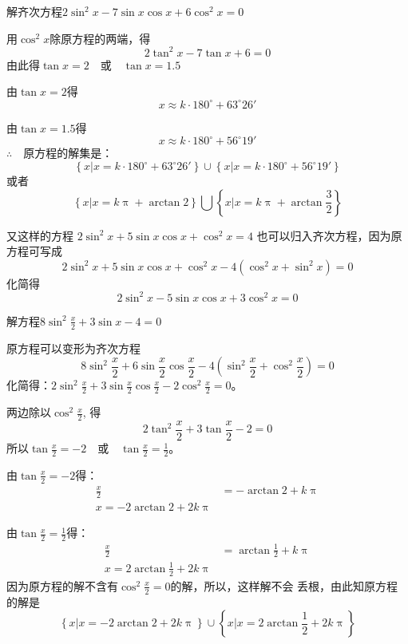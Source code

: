 \begin{example}
    解齐次方程$2\sin^2x-7\sin x\cos x+6\cos^2x=0$
\end{example}

\begin{solution}
用$\cos^2x$除原方程的两端，得
\[2\tan^2 x-7\tan x+6=0\]
由此得$\tan x=2\quad \text{或}\quad \tan x=1.5$

由$\tan x=2$得
\[x\approx k\cdot 180^{\circ}+63^{\circ}26'\]

由$\tan x=1.5$得
\[x\approx k\cdot 180^{\circ}+56^{\circ}19'\]
$\therefore\quad $原方程的解集是：
\[\left\{x\big|x=k\cdot 180^{\circ}+63^{\circ}26' \right\}\cup \left\{x\big|x=k\cdot 180^{\circ}+56^{\circ}19' \right\}\]
或者
\[\left\{x\big|x=k\uppi+\arctan 2 \right\}\bigcup\left\{x\big|x=k\uppi+\arctan\frac{3}{2} \right\}\]

又这样的方程
$2\sin^2x+5\sin x\cos x+\cos^2x=4$
也可以归入齐次方程，因为原方程可写成
\[2\sin^2x+5\sin x\cos x+\cos^2x-4(\cos^2x+\sin^2x)=0\]
化简得
\[2\sin^2x-5\sin x\cos x+3\cos^2x=0\]
\end{solution}

\begin{example}
    解方程$8\sin^2\frac{x}{2}+3\sin x-4=0$
\end{example}

\begin{solution}
    原方程可以变形为齐次方程
\[8\sin^2\frac{x}{2}+6\sin \frac{x}{2}\cos\frac{x}{2}-4\left(\sin^2\frac{x}{2}+\cos^2\frac{x}{2}\right)=0\]
化简得：$2\sin^2\frac{x}{2}+3\sin\frac{x}{2}\cos\frac{x}{2}-2\cos^2\frac{x}{2}=0$。

两边除以$\cos^2\frac{x}{2}$, 得
    \[2\tan^2\frac{x}{2}+3\tan\frac{x}{2}-2=0\]
所以$\tan\frac{x}{2}=-2\quad \text{或}\quad \tan\frac{x}{2}=\frac{1}{2}$。

由$\tan\frac{x}{2}=-2$得：
\[\begin{split}
    \frac{x}{2}&=-\arctan 2+k\uppi\\
    x=-2\arctan 2+2k\uppi
\end{split}\]

由$\tan\frac{x}{2}=\frac{1}{2}$得：
\[\begin{split}
    \frac{x}{2}&=\arctan \frac{1}{2}+k\uppi\\
    x=2\arctan \frac{1}{2}+2k\uppi
\end{split}\]
因为原方程的解不含有$\cos^2\frac{x}{2}=0$的解，所以，这样解不会
丢根，由此知原方程的解是
\[\left\{x\big|x=-2\arctan 2+2k\uppi \right\}\cup \left\{x\big|x=2\arctan \frac{1}{2}+2k\uppi \right\}\]
\end{solution}

